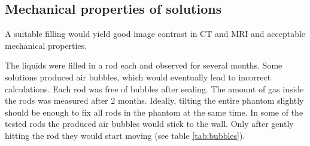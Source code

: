 \documentclass[parskip,bibtotoc,final,twoside=false,titlepage,a4paper,english,12pt,titlepage,a4paper]{scrbook}
\begin{document}
% 

\subsection{Mechanical properties of solutions}
A suitable filling would yield good image contrast in CT and MRI and acceptable mechanical properties.

The liquids were filled in a rod each and observed for several months. Some solutions produced air bubbles, which would eventually lead to incorrect calculations.
Each rod was free of bubbles after sealing. The amount of gas inside the rods was measured after 2 months. Ideally, tilting the entire phantom slightly should be enough to fix all rods in the phantom at the same time.
In some of the tested rods the produced air bubbles would stick to the wall. Only after gently hitting the rod they would start moving (see table \ref{tab:bubbles}).
\end{document}
